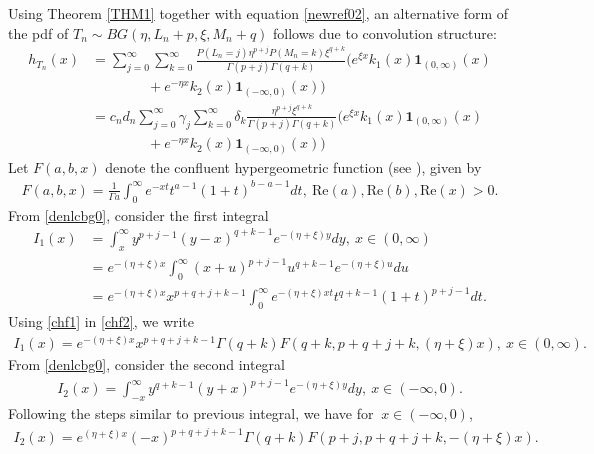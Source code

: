 \documentclass[12pt, a4paper,reqno]{amsart}
\theoremstyle{definition}
\theoremstyle{myremark}
\numberwithin{equation}{section}
\begin{document}
Using Theorem \ref{THM1} together with equation \eqref{newref02}, an alternative form of the pdf of $T_n \sim BG (\eta,L_n+p,\xi, M_n+q)$ follows due to convolution structure:
\begin{align}\label{denlcbg0}
\nonumber	h_{T_{n}}(x)&=\sum_{j=0}^{\infty}\sum_{k=0}^{\infty}\frac{P(L_n=j)\eta^{p+j} P(M_n=k)\xi^{q+k}}{\Gamma (p+j) \Gamma (q+k)} \big( e^{\xi x}k_1(x)\mathbf{1}_{(0,\infty)}(x)\\
\nonumber&\quad\quad\quad\quad+  e^{-\eta x}k_2(x)\mathbf{1}_{(-\infty,0)}(x)\big)\\
\nonumber	&=c_nd_n\sum_{j=0}^{\infty}\gamma_j\sum_{k=0}^{\infty}\delta_k\frac{\eta^{p+j} \xi^{q+k}}{\Gamma (p+j) \Gamma (q+k)} \big( e^{\xi x}k_1(x)\mathbf{1}_{(0,\infty)}(x)\\
&\quad\quad\quad\quad+  e^{-\eta x}k_2(x)\mathbf{1}_{(-\infty,0)}(x)\big)
\end{align}
\noindent
Let $ F(a,b,x)$ denote the confluent hypergeometric function (see \cite[equation (78)]{cam2001}), given by 
\begin{align}\label{chf1}
 F(a,b,x)=\frac{1}{\Gamma a}\displaystyle\int_{0}^{\infty}e^{-xt}t^{a-1}(1+t)^{b-a-1}dt, ~\text{Re}(a),\text{Re}(b),\text{Re}(x)>0.
\end{align}
\noindent
From \eqref{denlcbg0}, consider the first integral
\begin{align}\label{chf2}
	\nonumber I_1(x)&=\int_{x}^{\infty}y^{p+j-1}(y-x)^{q+k-1}e^{-(\eta+\xi)y}dy  ,~x\in(0,\infty)\\
	\nonumber &=e^{-(\eta+\xi)x}\int_{0}^{\infty}(x+u)^{p+j-1}u^{q+k-1}e^{-(\eta+\xi)u}du\\
	&=e^{-(\eta+\xi)x}x^{p+q+j+k-1}\displaystyle\int_{0}^{\infty}e^{-(\eta+\xi)xt}t^{q+k-1}(1+t)^{p+j-1}dt .
\end{align}
\noindent
Using \eqref{chf1} in \eqref{chf2}, we write
\begin{align}\label{chf3}
I_1(x)=e^{-(\eta+\xi)x}x^{p+q+j+k-1}\Gamma(q+k)F(q+k,p+q+j+k, (\eta+\xi)x), ~x\in (0,\infty).
\end{align}
\noindent
From \eqref{denlcbg0}, consider the second integral
\begin{align}\label{chf4}
I_2(x)=\int_{-x}^{\infty}y^{q+k-1}(y+x)^{p+j-1}e^{-(\eta+\xi)y}dy  ,~x\in(-\infty,0).
\end{align}
\noindent
Following the steps similar to previous integral, we have for $~x\in (-\infty,0)$,
\begin{align}\label{chf5}
I_2(x)=e^{(\eta+\xi)x}(-x)^{p+q+j+k-1}\Gamma(q+k)F(p+j,p+q+j+k, -(\eta+\xi)x). 
\end{align}
\end{document}
